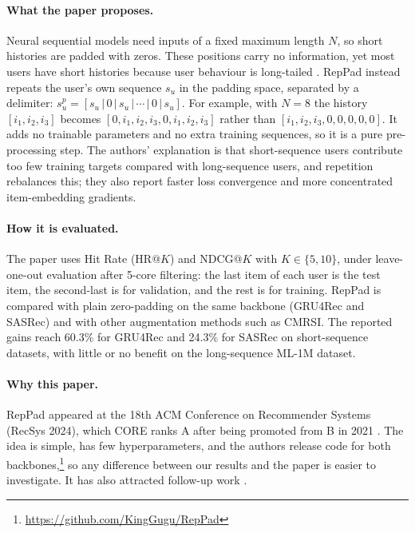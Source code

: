 \documentclass[11pt]{article}
\begin{document}
\paragraph{What the paper proposes.}
Neural sequential models need inputs of a fixed maximum length $N$, so short
histories are padded with zeros. These positions carry no information, yet most
users have short histories because user behaviour is long-tailed
\citep{dang2024repeated}. RepPad instead repeats the user's own sequence $s_u$
in the padding space, separated by a delimiter:
$s_u^p = [s_u \,|\, 0 \,|\, s_u \,|\, \cdots \,|\, 0 \,|\, s_u]$.
For example, with $N=8$ the history $[i_1,i_2,i_3]$ becomes
$[0,i_1,i_2,i_3,0,i_1,i_2,i_3]$ rather than $[i_1,i_2,i_3,0,0,0,0,0]$. It adds no
trainable parameters and no extra training sequences, so it is a pure
pre-processing step. The authors' explanation is that short-sequence users
contribute too few training targets compared with long-sequence users, and
repetition rebalances this; they also report faster loss convergence and more
concentrated item-embedding gradients.

\paragraph{How it is evaluated.}
The paper uses Hit Rate (HR@$K$) and NDCG@$K$ with $K\in\{5,10\}$, under
leave-one-out evaluation after 5-core filtering: the last item of each user is
the test item, the second-last is for validation, and the rest is for training.
RepPad is compared with plain zero-padding on the same backbone (GRU4Rec and
SASRec) and with other augmentation methods such as CMRSI. The reported gains
reach 60.3\% for GRU4Rec and 24.3\% for SASRec on short-sequence datasets, with
little or no benefit on the long-sequence ML-1M dataset.

\paragraph{Why this paper.}
RepPad appeared at the 18th ACM Conference on Recommender Systems (RecSys 2024),
which CORE ranks A \citep{core2023recsys} after being promoted from B in 2021
\citep{recsyscoreupgrade}. The idea is simple, has few hyperparameters, and the
authors release code for both backbones,\footnote{\url{https://github.com/KingGugu/RepPad}}
so any difference between our results and the paper is easier to investigate.
It has also attracted follow-up work \citep{dang2024reppadplus,dangzhifu2025payattention,dang2024survey}.
\end{document}

